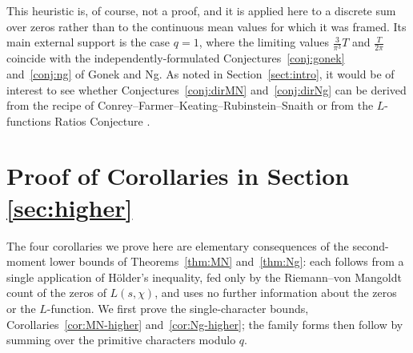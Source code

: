 \documentclass[10pt,a4paper]{amsart}
\numberwithin{equation}{section}
\begin{document}
This heuristic is, of course, not a proof, and it is applied here to a discrete sum over zeros rather than to the continuous mean values for which it was framed. Its main external support is the case $q=1$, where the limiting values $\tfrac{3}{\pi^3}T$ and $\tfrac{T}{2\pi}$ coincide with the independently-formulated Conjectures~\ref{conj:gonek} and~\ref{conj:ng} of Gonek and Ng. As noted in Section~\ref{sect:intro}, it would be of interest to see whether Conjectures~\ref{conj:dirMN} and~\ref{conj:dirNg} can be derived from the recipe of Conrey--Farmer--Keating--Rubinstein--Snaith \cite{CFKRS} or from the $L$-functions Ratios Conjecture \cite{CFZ,ConreySnaith}.

\section{Proof of Corollaries in Section \ref{sec:higher}}\label{sec:higher-proofs}

The four corollaries we prove here are elementary consequences of the second-moment lower bounds of Theorems~\ref{thm:MN} and~\ref{thm:Ng}: each follows from a single application of H\"older's inequality, fed only by the Riemann--von Mangoldt count of the zeros of $L(s,\chi)$, and uses no further information about the zeros or the $L$-function. We first prove the single-character bounds, Corollaries~\ref{cor:MN-higher} and~\ref{cor:Ng-higher}; the family forms then follow by summing over the primitive characters modulo $q$.
\end{document}
